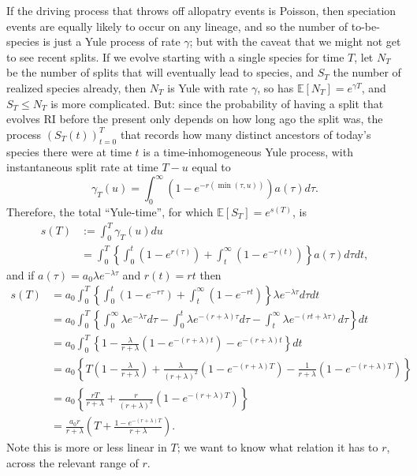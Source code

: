 \documentclass{article}
\newcommand{\E}{\mathbb{E}}
\begin{document}
If the driving process that throws off allopatry events is Poisson,
then speciation events are equally likely to occur on any lineage,
and so the number of to-be-species
is just a Yule process of rate $\gamma$;
but with the caveat that we might not get to see recent splits.
If we evolve starting with a single species for time $T$, 
let $N_T$ be the number of splits that will eventually lead to species,
and $S_T$ the number of realized species already,
then $N_T$ is Yule with rate $\gamma$, 
so has $\E[N_T] = e^{\gamma T}$,
and $S_T \le N_T$ is more complicated.
But: since the probability of having a split that evolves RI before the present
only depends on how long ago the split was,
the process $(S_T(t))_{t=0}^T$ that records how many distinct ancestors of today's species there were at time $t$
is a time-inhomogeneous Yule process,
with instantaneous split rate at time $T-u$ equal to
\[
\gamma_T(u) = \int_0^\infty (1-e^{-r(\min(\tau,u))}) a(\tau) d\tau .
\]
Therefore, the total ``Yule-time'', for which $\E[S_T] = e^{s(T)}$, is 
\begin{align}
  s(T) &:= \int_0^T \gamma_T(u) du \\
  &= \int_0^T \left\{ \int_0^t (1-e^{r(\tau)}) + \int_t^\infty (1-e^{-r(t)}) \right\} a(\tau) d\tau dt ,
\end{align}
and if $a(\tau) = a_0 \lambda e^{-\lambda \tau}$ and $r(t) = rt$ then
\begin{align}
  s(T) &= a_0 \int_0^T \left\{ \int_0^t (1-e^{-r\tau}) + \int_t^\infty(1-e^{-rt}) \right\} \lambda e^{-\lambda \tau} d\tau dt \\
  &= a_0 \int_0^T \left\{ \int_0^\infty \lambda e^{-\lambda \tau} d\tau - \int_0^t \lambda e^{-(r+\lambda) \tau} d\tau - \int_t^\infty \lambda e^{-(rt+\lambda\tau)} d\tau \right\} dt \\
  &= a_0 \int_0^T \left\{ 1- \frac{\lambda}{r+\lambda} (1-e^{-(r+\lambda) t}) - e^{-(r+\lambda)t} \right\} dt \\
  &= a_0 \left\{ T \left( 1 - \frac{\lambda}{r+\lambda} \right) + \frac{\lambda}{(r+\lambda)^2} (1-e^{-(r+\lambda) T}) - \frac{1}{r+\lambda} \left( 1 - e^{-(r+\lambda)T} \right) \right\} \\
  &= a_0 \left\{ \frac{rT}{r+\lambda} + \frac{r}{(r+\lambda)^2} (1-e^{-(r+\lambda) T}) \right\} \\
  &= \frac{a_0 r}{r+\lambda} \left( T + \frac{ 1-e^{-(r+\lambda)T} }{ r+\lambda } \right) .
\end{align}
Note this is more or less linear in $T$; we want to know what relation it has to $r$,
across the relevant range of $r$.
\end{document}
